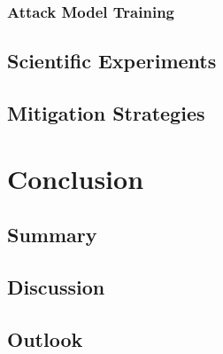 \documentclass[runningheads]{llncs}
\begin{document}
\subsubsection{Attack Model Training}

\subsubsection{}

\subsection{Scientific Experiments}
\subsection{Mitigation Strategies}

\section{Conclusion}
\subsection{Summary}
\subsection{Discussion}
\subsection{Outlook}



%
%
%
% 
% 
%

\printbibliography
\end{document}
